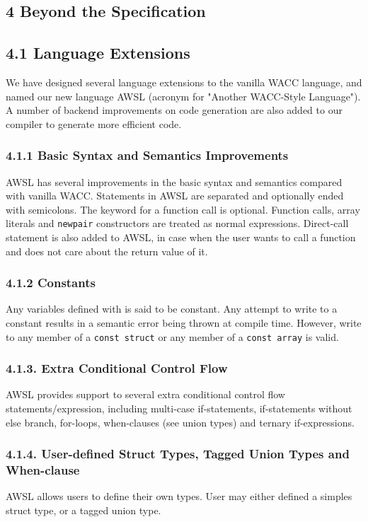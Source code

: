 \documentclass[10pt,a4paper,]{report}
\begin{document}
  \subsection*{4 Beyond the Specification}

  \subsection*{4.1 Language Extensions}
  We have designed several language extensions to the vanilla WACC language, and
  named our new language AWSL (acronym for "Another WACC-Style Language"). A
  number of backend improvements on code generation are also added to our
  compiler to generate more efficient code.

  \subsubsection*{4.1.1 Basic Syntax and Semantics Improvements}
  AWSL has several improvements in the basic syntax and semantics compared with
  vanilla WACC. Statements in AWSL are separated and optionally ended with
  semicolons. The  keyword for a function call is optional.
  Function calls, array literals and \texttt{newpair} constructors are treated as normal
  expressions. Direct-call statement is also added to AWSL, in case when the
  user wants to call a function and does not care about the return value of it.

  \subsubsection*{4.1.2 Constants}
  Any variables defined with  is said to be constant. Any attempt
  to write to a constant results in a semantic error being thrown at compile time.
  However, write to any member of a \texttt{const struct} or any member of a
  \texttt{const array} is valid. 

  \subsubsection*{4.1.3. Extra Conditional Control Flow}
  AWSL provides support to several extra conditional control flow
  statements/expression, including multi-case if-statements, if-statements
  without else branch, for-loops, when-clauses (see union types) and ternary
  if-expressions. 

  \subsubsection*{4.1.4. User-defined Struct Types, Tagged Union Types and When-clause}
  AWSL allows users to define their own types. User may either defined a simples
  struct type, or a tagged union type.
\end{document}
